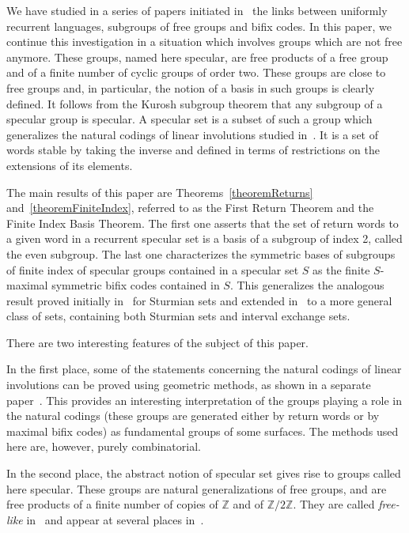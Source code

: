 \documentclass[preprint,12pt]{elsarticle}
\newcommand{\Z}{\mathbb{Z}}
\numberwithin{theorem}{section}
\numberwithin{equation}{section}
\numberwithin{figure}{section}
\numberwithin{table}{section}
\begin{document}
We have studied in a series of papers initiated in~\cite{BerstelDeFelicePerrinReutenauerRindone2012} the links between uniformly recurrent languages, subgroups of free groups and bifix codes.
In this paper, we continue this investigation in a situation which involves groups which are not free anymore.
These groups, named here specular, are free products of a free group and of a finite number of cyclic groups of order two.
These groups are close to free groups and, in particular, the notion of a basis in such groups is clearly defined.
It follows from the Kurosh subgroup theorem that any subgroup of a specular group is specular.
A specular set is a subset of such a group which generalizes the natural codings of linear involutions studied in~\cite{BertheDelecroixDolcePerrinReutenauerRindone2014}.
It is a set of words stable by taking the inverse and defined in terms of restrictions on the extensions of its elements.

The main results of this paper are Theorems~\ref{theoremReturns} and~\ref{theoremFiniteIndex}, referred to as the First Return Theorem and the Finite Index Basis Theorem.
The first one asserts that the set of return words to a given word in a recurrent specular set is a basis of a subgroup of index 2, called the even subgroup.
The last one characterizes the symmetric bases of subgroups of finite index of specular groups contained in a specular set $S$ as the finite $S$-maximal symmetric bifix codes contained in $S$. This generalizes the analogous result proved initially in~\cite{BerstelDeFelicePerrinReutenauerRindone2012} for Sturmian sets and extended in~\cite{BertheDeFeliceDolceLeroyPerrinReutenauerRindone2013b} to a more general class of sets, containing both Sturmian sets and interval exchange sets.

There are two interesting features of the subject of this paper.

In the first place, some of the statements concerning the natural codings of linear involutions can be proved using geometric methods, as shown in a separate paper~\cite{BertheDelecroixDolcePerrinReutenauerRindone2014}.
This provides an interesting interpretation of the groups playing a role in the natural codings (these groups are generated either by return words or by maximal bifix codes) as fundamental groups of some surfaces.
The methods used here are, however, purely combinatorial.

In the second place, the abstract notion of specular set gives rise to groups called here specular.
These groups are natural generalizations of free groups, and are free products of a finite number of copies of $\Z$ and of $\Z/2\Z$.
They are called \emph{free-like} in~\cite{Bartholdi2014} and appear at several places in~\cite{Harpe2000}.
\end{document}
